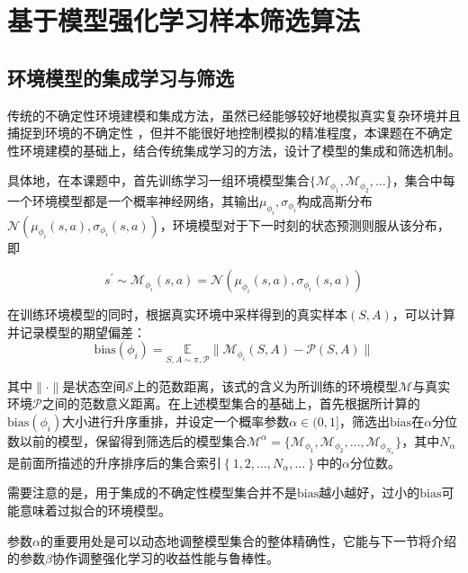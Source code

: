
\chapter{基于模型强化学习样本筛选算法}

\section{环境模型的集成学习与筛选}\label{sec:model-method}

传统的不确定性环境建模和集成方法，虽然已经能够较好地模拟真实复杂环境并且捕捉到环境的不确定性 \cite{duan2007multi}，但并不能很好地控制模拟的精准程度，本课题在不确定性环境建模的基础上，结合传统集成学习的方法，设计了模型的集成和筛选机制。

具体地，在本课题中，首先训练学习一组环境模型集合$\{\mathcal{M}_{\phi_1},\mathcal{M}_{\phi_2},\ldots\}$，集合中每一个环境模型都是一个概率神经网络，其输出$\mu_{\phi_i},\sigma_{\phi_i}$构成高斯分布$\mathcal{N}(\mu_{\phi_i}(s,a),\sigma_{\phi_i}(s,a))$，环境模型对于下一时刻的状态预测则服从该分布，即

\begin{equation}
    s^\prime \sim \mathcal{M}_{\phi_i}(s,a) = \mathcal{N}(\mu_{\phi_i}(s,a),\sigma_{\phi_i}(s,a))
\end{equation}

在训练环境模型的同时，根据真实环境中采样得到的真实样本$(S,A)$，可以计算并记录模型的期望偏差：
\begin{equation}
    \mathrm{bias}(\phi_i) = \underset{S,A\sim \pi,\mathcal{P}}{\mathbb{E}}\|\mathcal{M}_{\phi_i}(S,A)-\mathcal{P}(S,A)\|
\end{equation}

其中$\|\cdot\|$是状态空间$\mathcal{S}$上的范数距离，该式的含义为所训练的环境模型$\mathcal{M}$与真实环境$\mathcal{P}$之间的范数意义距离。在上述模型集合的基础上，首先根据所计算的$\mathrm{bias}(\phi_i)$大小进行升序重排，并设定一个概率参数$\alpha\in(0,1]$，筛选出$\mathrm{bias}$在$\alpha$分位数以前的模型，保留得到筛选后的模型集合$\mathcal{M}^\alpha = \{\mathcal{M}_{\phi_1},\mathcal{M}_{\phi_2},\ldots,\mathcal{M}_{\phi_{N_\alpha}}\}$，其中$N_\alpha$是前面所描述的升序排序后的集合索引$\left\{1,2,\ldots,N_\alpha,\ldots\right\}$中的$\alpha$分位数。

需要注意的是，用于集成的不确定性模型集合并不是$\mathrm{bias}$越小越好，过小的$\mathrm{bias}$可能意味着过拟合的环境模型。

参数$\alpha$的重要用处是可以动态地调整模型集合的整体精确性，它能与下一节将介绍的参数$\beta$协作调整强化学习的收益性能与鲁棒性。

